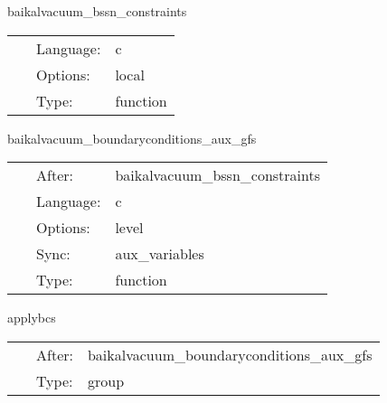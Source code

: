 \vspace{5mm}


\hspace{5mm} baikalvacuum\_bssn\_constraints 

\hspace{5mm}{\it compute bssn (hamiltonian and momentum) constraints } 


\hspace{5mm}

 \begin{tabular*}{160mm}{cll} 
~ & Language:  & c \\ 
~ & Options:  & local \\ 
~ & Type:  & function \\ 
\end{tabular*} 


\vspace{5mm}


\hspace{5mm} baikalvacuum\_boundaryconditions\_aux\_gfs 

\hspace{5mm}{\it enforce symmetry bcs in constraint computation } 


\hspace{5mm}

 \begin{tabular*}{160mm}{cll} 
~ & After:  & baikalvacuum\_bssn\_constraints \\ 
~ & Language:  & c \\ 
~ & Options:  & level \\ 
~ & Sync:  & aux\_variables \\ 
~ & Type:  & function \\ 
\end{tabular*} 


\vspace{5mm}


\hspace{5mm} applybcs 

\hspace{5mm}{\it apply boundary conditions } 


\hspace{5mm}

 \begin{tabular*}{160mm}{cll} 
~ & After:  & baikalvacuum\_boundaryconditions\_aux\_gfs \\ 
~ & Type:  & group \\ 
\end{tabular*} 


